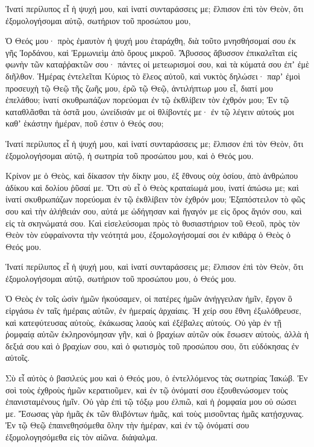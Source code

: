 \begin{spacing}{1.1}
\begin{multicols}{2}
Ἱνατί περίλυπος εἶ ἡ ψυχή μου, καὶ ἱνατί συνταράσσεις με; ἔλπισον ἐπὶ τὸν Θεὸν, ὅτι ἐξομολογήσομαι αὐτῷ, σωτήριον τοῦ προσώπου μου,

Ὁ Θεός μου· πρὸς ἐμαυτὸν ἡ ψυχή μου ἐταράχθη, διὰ τοῦτο μνησθήσομαί σου ἐκ γῆς Ἰορδάνου, καὶ Ἐρμωνιεὶμ ἀπὸ ὄρους μικροῦ.
Ἄβυσσος ἄβυσσον ἐπικαλεῖται εἰς φωνὴν τῶν καταῤῥακτῶν σου· πάντες οἱ μετεωρισμοί σου, καὶ τὰ κύματά σου ἐπʼ ἐμὲ διῆλθον.
Ἡμέρας ἐντελεῖται Κύριος τὸ ἔλεος αὐτοῦ, καὶ νυκτὸς δηλώσει· παρʼ ἐμοὶ προσευχὴ τῷ Θεῷ τῆς ζωῆς μου,
ἐρῶ τῷ Θεῷ, ἀντιλήπτωρ μου εἶ, διατί μου ἐπελάθου; ἱνατί σκυθρωπάζων πορεύομαι ἐν τῷ ἐκθλίβειν τὸν ἐχθρόν μου;
Ἐν τῷ καταθλᾶσθαι τὰ ὀστᾶ μου, ὠνείδισάν με οἱ θλίβοντές με· ἐν τῷ λέγειν αὐτούς μοι καθʼ ἑκάστην ἡμέραν, ποῦ ἐστιν ὁ Θεός σου;

Ἱνατί περίλυπος εἶ ἡ ψυχή μου, καὶ ἱνατί συνταράσσεις με; ἔλπισον ἐπὶ τὸν Θεὸν, ὅτι ἐξομολογήσομαι αὐτῷ, ἡ σωτηρία τοῦ προσώπου μου, καὶ ὁ Θεός μου.

Κρίνον με ὁ Θεὸς, καὶ δίκασον τὴν δίκην μου, ἐξ ἔθνους οὐχ ὁσίου, ἀπὸ ἀνθρώπου ἀδίκου καὶ δολίου ῥῦσαί με.
Ὅτι σὺ εἶ ὁ Θεὸς κραταίωμά μου, ἱνατί ἀπώσω με; καὶ ἱνατί σκυθρωπάζων πορεύομαι ἐν τῷ ἐκθλίβειν τὸν ἐχθρόν μου;
Ἐξαπόστειλον τὸ φῶς σου καὶ τὴν ἀλήθειάν σου, αὐτά με ὡδήγησαν καὶ ἤγαγόν με εἰς ὄρος ἅγιόν σου, καὶ εἰς τὰ σκηνώματά σου.
Καὶ εἰσελεύσομαι πρὸς τὸ θυσιαστήριον τοῦ Θεοῦ, πρὸς τὸν Θεὸν τὸν εὐφραίνοντα τὴν νεότητά μου, ἐξομολογήσομαί σοι ἐν κιθάρᾳ ὁ Θεὸς ὁ Θεός μου.

Ἱνατί περίλυπος εἶ ἡ ψυχή μου, καὶ ἱνατί συνταράσσεις με; ἔλπισον ἐπὶ τὸν Θεὸν, ὅτι ἐξομολογήσομαι αὐτῷ, σωτήριον τοῦ προσώπου μου, ὁ Θεός μου.

Ὁ Θεὸς ἐν τοῖς ὠσὶν ἡμῶν ἠκούσαμεν, οἱ πατέρες ἡμῶν ἀνήγγειλαν ἡμῖν, ἔργον ὃ εἰργάσω ἐν ταῖς ἡμέραις αὐτῶν, ἐν ἡμεραίς ἀρχαίαις.
Ἡ χείρ σου ἔθνη ἐξωλόθρευσε, καὶ κατεφύτευσας αὐτοὺς, ἐκάκωσας λαοὺς καὶ ἐξέβαλες αὐτούς.
Οὐ γὰρ ἐν τῇ ῥομφαίᾳ αὐτῶν ἐκληρονόμησαν γῆν, καὶ ὁ βραχίων αὐτῶν οὐκ ἔσωσεν αὐτοὺς, ἀλλὰ ἡ δεξιά σου καὶ ὁ βραχίων σου, καὶ ὁ φωτισμὸς τοῦ προσώπου σου, ὅτι εὐδόκησας ἐν αὐτοῖς.

Σὺ εἶ αὐτὸς ὁ βασιλεύς μου καὶ ὁ Θεός μου, ὁ ἐντελλόμενος τὰς σωτηρίας Ἰακώβ.
Ἐν σοὶ τοὺς ἐχθροὺς ἡμῶν κερατιοῦμεν, καὶ ἐν τῷ ὀνόματί σου ἐξουθενώσομεν τοὺς ἐπανισταμένους ἡμῖν.
Οὐ γὰρ ἐπὶ τῷ τόξῳ μου ἐλπιῶ, καὶ ἡ ῥομφαία μου οὐ σώσει με.
Ἔσωσας γὰρ ἡμᾶς ἐκ τῶν θλιβόντων ἡμᾶς, καὶ τοὺς μισοῦντας ἡμᾶς κατῄσχυνας.
Ἐν τῷ Θεῷ ἐπαινεθησόμεθα ὅλην τὴν ἡμέραν, καὶ ἐν τῷ ὀνόματί σου ἐξομολογησόμεθα εἰς τὸν αἰῶνα. διάψαλμα.


\end{multicols}
\end{spacing}
